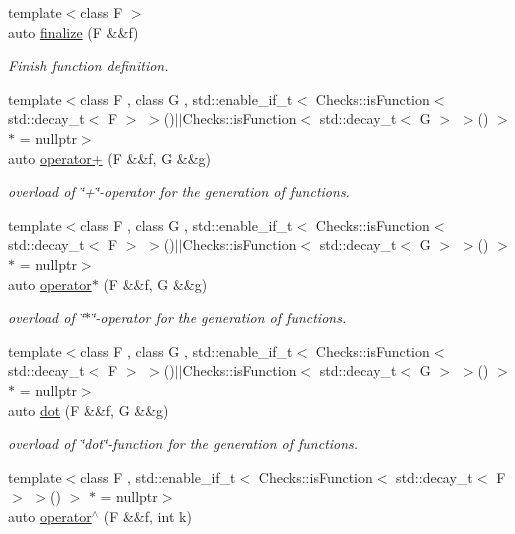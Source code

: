 \begin{DoxyCompactItemize}
{\footnotesize template$<$class F $>$ }\\auto \hyperlink{namespaceFunG_ac59f2ececc3cd451860776320a4a93d5}{finalize} (F \&\&f)
\begin{DoxyCompactList}\small\item\em Finish function definition. \end{DoxyCompactList}\item 
{\footnotesize template$<$class F , class G , std\+::enable\+\_\+if\+\_\+t$<$ Checks\+::is\+Function$<$ std\+::decay\+\_\+t$<$ F $>$ $>$()$\vert$$\vert$\+Checks\+::is\+Function$<$ std\+::decay\+\_\+t$<$ G $>$ $>$() $>$ $\ast$  = nullptr$>$ }\\auto \hyperlink{namespaceFunG_a24bb5d609b022030afda2d8589cf5509}{operator+} (F \&\&f, G \&\&g)
\begin{DoxyCompactList}\small\item\em overload of \char`\"{}+\char`\"{}-\/operator for the generation of functions. \end{DoxyCompactList}\item 
{\footnotesize template$<$class F , class G , std\+::enable\+\_\+if\+\_\+t$<$ Checks\+::is\+Function$<$ std\+::decay\+\_\+t$<$ F $>$ $>$()$\vert$$\vert$\+Checks\+::is\+Function$<$ std\+::decay\+\_\+t$<$ G $>$ $>$() $>$ $\ast$  = nullptr$>$ }\\auto \hyperlink{namespaceFunG_a267562e725c73ece1c1d057b5f29511f}{operator$\ast$} (F \&\&f, G \&\&g)
\begin{DoxyCompactList}\small\item\em overload of \char`\"{}$\ast$\char`\"{}-\/operator for the generation of functions. \end{DoxyCompactList}\item 
{\footnotesize template$<$class F , class G , std\+::enable\+\_\+if\+\_\+t$<$ Checks\+::is\+Function$<$ std\+::decay\+\_\+t$<$ F $>$ $>$()$\vert$$\vert$\+Checks\+::is\+Function$<$ std\+::decay\+\_\+t$<$ G $>$ $>$() $>$ $\ast$  = nullptr$>$ }\\auto \hyperlink{namespaceFunG_ac73eb907f3d29a9ea60513a43c658270}{dot} (F \&\&f, G \&\&g)
\begin{DoxyCompactList}\small\item\em overload of \char`\"{}dot\char`\"{}-\/function for the generation of functions. \end{DoxyCompactList}\item 
{\footnotesize template$<$class F , std\+::enable\+\_\+if\+\_\+t$<$ Checks\+::is\+Function$<$ std\+::decay\+\_\+t$<$ F $>$ $>$() $>$ $\ast$  = nullptr$>$ }\\auto \hyperlink{namespaceFunG_a94273e3ea80324e591bb98ae3c051221}{operator$^\wedge$} (F \&\&f, int k)

\end{DoxyCompactItemize}
